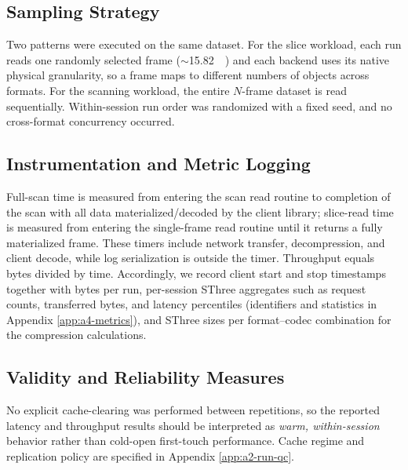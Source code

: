 \documentclass[nomenclature, english, bibtex]{kththesis}
\numberwithin{listing}{chapter}
\begin{document}
\subsection{Sampling Strategy}
Two patterns were executed on the same dataset. For the slice workload, each run reads one randomly selected frame (\(\sim\)\SI{15.82}{\mebi\byte}) and each backend uses its native physical granularity, so a frame maps to different numbers of objects across formats. For the scanning workload, the entire $N$-frame dataset is read sequentially. Within-session run order was randomized with a fixed seed, and no cross-format concurrency occurred.

\subsection{Instrumentation and Metric Logging}
Full-scan time is measured from entering the scan read routine to completion of the scan with all data materialized/decoded by the client library; slice-read time is measured from entering the single-frame read routine until it returns a fully materialized frame. These timers include network transfer, decompression, and client decode, while log serialization is outside the timer. Throughput equals bytes divided by time. Accordingly, we record client start and stop timestamps together with bytes per run, per-session \gls{SThree} aggregates such as request counts, transferred bytes, and latency percentiles (identifiers and statistics in Appendix \ref{app:a4-metrics}), and \gls{SThree} sizes per format--codec combination for the compression calculations.

\subsection{Validity and Reliability Measures}
No explicit cache-clearing was performed between repetitions, so the reported latency and throughput results should be interpreted as \emph{warm, within-session} behavior rather than cold-open first-touch performance. Cache regime and replication policy are specified in Appendix \ref{app:a2-run-qc}.
\end{document}
